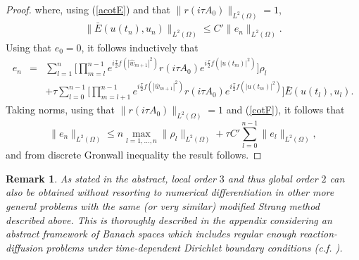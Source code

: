 \documentclass[a4paper,12pt]{article}
\newtheorem{theorem}{Theorem}
\newtheorem{remark}[theorem]{Remark}
\begin{document}
\begin{proof}
where, using (\ref{acotE}) and that $\|r(i \tau A_0)\|_{L^2(\Omega)}=1$,
\begin{eqnarray}
\|\bar{E}(u(t_n), u_n)\|_{L^2(\Omega)}\le C' \|e_n\|_{L^2(\Omega)}.
\label{cotF}
\end{eqnarray}
Using that $e_0=0$, it follows inductively that
\begin{eqnarray}
e_n&=&\sum_{l=1}^n \bigg[\prod_{m=l}^{n-1} e^{i \frac{\tau}{2}f(|\hat{w}_{m+1}|^2)}r(i \tau A_0) e^{i \frac{\tau}{2}f(|u(t_m)|^2)} \bigg]\rho_l
\nonumber \\
&&+\tau \sum_{l=0}^{n-1} \bigg[\prod_{m=l+1}^{n-1} e^{i \frac{\tau}{2}f(|\hat{w}_{m+1}|^2)}r(i \tau A_0) e^{i \frac{\tau}{2}f(|u(t_m)|^2)}\bigg] \bar{E}(u(t_l),u_l).
\nonumber
\end{eqnarray}
Taking norms, using that $\|r(i \tau A_0)\|_{L^2(\Omega)}=1$ and (\ref{cotF}), it follows that
$$
\|e_n\|_{L^2(\Omega)} \le n \max_{l=1,\dots,n} \|\rho_l\|_{L^2(\Omega)}+\tau C' \sum_{l=0}^{n-1} \|e_l\|_{L^2(\Omega)},
$$
and from discrete Gronwall inequality the result follows.
\end{proof}



\begin{remark}
As stated in the abstract,
local order $3$ and thus global order $2$ can also be obtained without resorting to numerical differentiation in other more general problems with the same (or very similar) modified Strang method described above. This is thoroughly described in the appendix considering an abstract framework of Banach spaces which includes regular enough reaction-diffusion problems under time-dependent Dirichlet boundary conditions (c.f. \cite{ACR}).
\end{remark}
\end{document}
